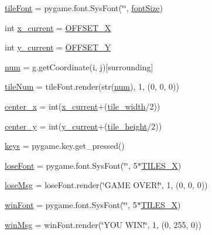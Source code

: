 \begin{DoxyCompactItemize}
\item 
\mbox{\hyperlink{namespaceminesweeper_a57a5c5cbc70cec16f2dc0c2b524ec53b}{tile\+Font}} = pygame.\+font.\+Sys\+Font(\char`\"{}\char`\"{}, \mbox{\hyperlink{namespaceminesweeper_a8d7e0edcef8465377296847bc7110ada}{font\+Size}})
\item 
int \mbox{\hyperlink{namespaceminesweeper_a28942e4d6e641ff5809c76fa7d9a8ac7}{x\+\_\+current}} = \mbox{\hyperlink{namespaceminesweeper_a6a4ccfa26ab8b9aac5722b057e9eddbd}{O\+F\+F\+S\+E\+T\+\_\+X}}
\item 
int \mbox{\hyperlink{namespaceminesweeper_ad3bd8e814d4008f5bfd13e994479b5e4}{y\+\_\+current}} = \mbox{\hyperlink{namespaceminesweeper_aa2fd039a9a652a54874cec33ba8e157b}{O\+F\+F\+S\+E\+T\+\_\+Y}}
\item 
\mbox{\hyperlink{namespaceminesweeper_ab98a5a8f716307b1802794c8b8531461}{num}} = g.\+get\+Coordinate(i, j)\mbox{[}\textquotesingle{}surrounding\textquotesingle{}\mbox{]}
\item 
\mbox{\hyperlink{namespaceminesweeper_aabb074303bb202fba9d36dfa9803a877}{tile\+Num}} = tile\+Font.\+render(str(\mbox{\hyperlink{namespaceminesweeper_ab98a5a8f716307b1802794c8b8531461}{num}}), 1, (0, 0, 0))
\item 
\mbox{\hyperlink{namespaceminesweeper_a9f77150ad90d6a98a617936ba74f1064}{center\+\_\+x}} = int(\mbox{\hyperlink{namespaceminesweeper_a28942e4d6e641ff5809c76fa7d9a8ac7}{x\+\_\+current}}+(\mbox{\hyperlink{namespaceminesweeper_a528cb94bc9f0e9a64f2923e0414591ed}{tile\+\_\+width}}/2))
\item 
\mbox{\hyperlink{namespaceminesweeper_ab52733b88daedc140eaa8e04678318c5}{center\+\_\+y}} = int(\mbox{\hyperlink{namespaceminesweeper_ad3bd8e814d4008f5bfd13e994479b5e4}{y\+\_\+current}}+(\mbox{\hyperlink{namespaceminesweeper_a033197bb6aa4149287e9c4fcdeff7d96}{tile\+\_\+height}}/2))
\item 
\mbox{\hyperlink{namespaceminesweeper_a2ba68d97d759f1a1f48f1ec7ff395775}{keys}} = pygame.\+key.\+get\+\_\+pressed()
\item 
\mbox{\hyperlink{namespaceminesweeper_a91b8bac9c1df867502bf8012eb6deadb}{lose\+Font}} = pygame.\+font.\+Sys\+Font(\char`\"{}\char`\"{}, 5$\ast$\mbox{\hyperlink{namespaceminesweeper_ac9707e38bc10ae8def8674e284754df2}{T\+I\+L\+E\+S\+\_\+X}})
\item 
\mbox{\hyperlink{namespaceminesweeper_a25f42eeff70bbdebf714d066168c27f5}{lose\+Msg}} = lose\+Font.\+render(\char`\"{}G\+A\+ME O\+V\+E\+R!\char`\"{}, 1, (0, 0, 0))
\item 
\mbox{\hyperlink{namespaceminesweeper_a7f21f866eb7478d5b9b47b687f81db30}{win\+Font}} = pygame.\+font.\+Sys\+Font(\char`\"{}\char`\"{}, 5$\ast$\mbox{\hyperlink{namespaceminesweeper_ac9707e38bc10ae8def8674e284754df2}{T\+I\+L\+E\+S\+\_\+X}})
\item 
\mbox{\hyperlink{namespaceminesweeper_a45581fb97532e945c271d97578355bec}{win\+Msg}} = win\+Font.\+render(\char`\"{}Y\+OU W\+I\+N!\char`\"{}, 1, (0, 255, 0))
\end{DoxyCompactItemize}


